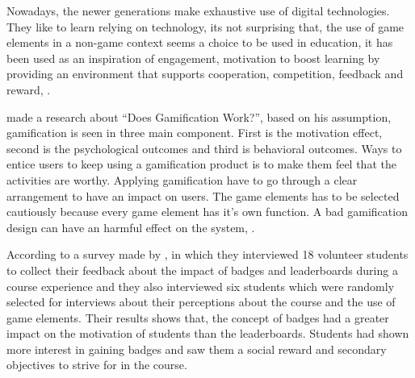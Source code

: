 Nowadays, the newer generations make exhaustive use of digital technologies. They like to learn relying on technology, its not surprising that, the use of game elements in a non-game context seems a choice to be used in education, it has been used as an inspiration of engagement, motivation to boost learning by providing an environment that supports cooperation, competition, feedback and reward, \cite{kaplan2010users}.

\cite{hamari2014does} made a research about “Does Gamification Work?”, based on his assumption, gamification is seen in three main component. First is the motivation effect, second is the psychological outcomes and third is behavioral outcomes. Ways to entice users to keep using a gamification product is to make them feel that the activities are worthy. Applying gamification have to go through a clear arrangement to have an impact on users. The game elements has to be selected cautiously because every game element has it's own function. A bad gamification design can have an harmful effect on the system, \cite{hanus2015assessing}.

According to a survey made by \cite{uskov2014gamification}, in which they interviewed 18 volunteer students to collect their feedback about the impact of badges and leaderboards during a course experience and they also interviewed six students which were randomly selected for interviews about their perceptions about the course and the use of game elements. Their results shows that, the concept of badges had a greater impact on the motivation of students than the leaderboards. Students had shown more interest in gaining badges and saw them a social reward and secondary objectives to strive for in the course.

